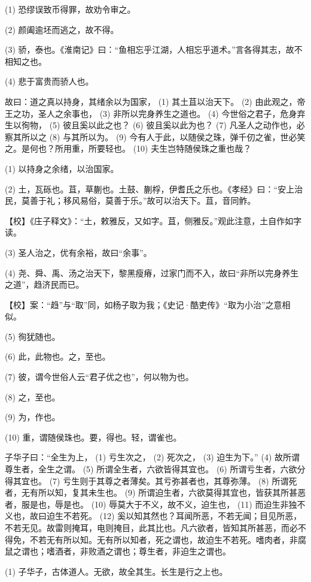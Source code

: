 \documentclass[12pt,UTF8]{ctexbook}
\begin{document}
(1) 恐缪误致币得罪，故劝令审之。

(2) 颜阖逾坯而逃之，故不得。

(3) 骄，泰也。《淮南记》曰：“鱼相忘乎江湖，人相忘乎道术。”言各得其志，故不相知之也。

(4) 悲于富贵而骄人也。

故曰：道之真以持身，其绪余以为国家， (1) 其土苴以治天下。 (2) 由此观之，帝王之功，圣人之余事也， (3) 非所以完身养生之道也。 (4) 今世俗之君子，危身弃生以徇物， (5) 彼且奚以此之也？ (6) 彼且奚以此为也？ (7) 凡圣人之动作也，必察其所以之 (8) 与其所以为。 (9) 今有人于此，以随侯之珠，弹千仞之雀，世必笑之。是何也？所用重，所要轻也。 (10) 夫生岂特随侯珠之重也哉？

(1) 以持身之余绪，以治国家。

(2) 土，瓦砾也。苴，草蒯也。土鼓、蒯桴，伊耆氏之乐也。《孝经》曰：“安上治民，莫善于礼；移风易俗，莫善于乐。”故可以治天下。苴，音同鲊。

【校】《庄子释文》：“土，敕雅反，又如字。苴，侧雅反。”观此注意，土自作如字读。

(3) 圣人治之，优有余裕，故曰“余事”。

(4) 尧、舜、禹、汤之治天下，黎黑瘦瘠，过家门而不入，故曰“非所以完身养生之道”，趋济民而已。

【校】案：“趋”与“取”同，如杨子取为我；《史记·酷吏传》“取为小治”之意相似。

(5) 徇犹随也。

(6) 此，此物也。之，至也。

(7) 彼，谓今世俗人云“君子优之也”，何以物为也。

(8) 之，至也。

(9) 为，作也。

(10) 重，谓随侯珠也。要，得也。轻，谓雀也。

子华子曰：“全生为上， (1) 亏生次之， (2) 死次之， (3) 迫生为下。” (4) 故所谓尊生者，全生之谓。 (5) 所谓全生者，六欲皆得其宜也。 (6) 所谓亏生者，六欲分得其宜也。 (7) 亏生则于其尊之者薄矣。其亏弥甚者也，其尊弥薄。 (8) 所谓死者，无有所以知，复其未生也。 (9) 所谓迫生者，六欲莫得其宜也，皆获其所甚恶者，服是也，辱是也。 (10) 辱莫大于不义，故不义，迫生也， (11) 而迫生非独不义也，故曰迫生不若死。 (12) 奚以知其然也？耳闻所恶，不若无闻；目见所恶，不若无见。故雷则掩耳，电则掩目，此其比也。凡六欲者，皆知其所甚恶，而必不得免，不若无有所以知。无有所以知者，死之谓也，故迫生不若死。嗜肉者，非腐鼠之谓也；嗜酒者，非败酒之谓也；尊生者，非迫生之谓也。

(1) 子华子，古体道人。无欲，故全其生。长生是行之上也。
\end{document}
